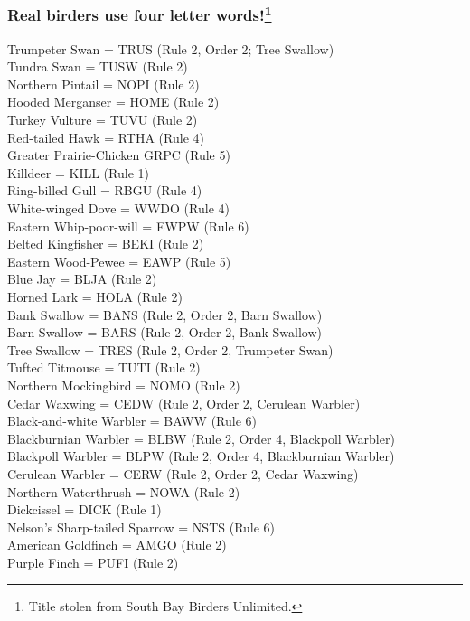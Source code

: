\documentclass[11pt]{article}
\begin{document}
\thispagestyle{plain}

\subsubsection*{Real birders use four letter words!\footnote{Title stolen from South Bay Birders Unlimited.}}

Trumpeter Swan = TRUS (Rule 2, Order 2; Tree Swallow)\\
Tundra Swan = TUSW (Rule 2)\\
Northern Pintail = NOPI (Rule 2)\\
Hooded Merganser = HOME (Rule 2)\\
Turkey Vulture = TUVU (Rule 2)\\
Red-tailed Hawk = RTHA (Rule 4)\\
Greater Prairie-Chicken GRPC (Rule 5)\\
Killdeer = KILL (Rule 1)\\
Ring-billed Gull = RBGU (Rule 4)\\
White-winged Dove = WWDO (Rule 4)\\
Eastern Whip-poor-will  = EWPW (Rule 6)\\
Belted Kingfisher = BEKI (Rule 2)\\
Eastern Wood-Pewee = EAWP (Rule 5)\\
Blue Jay = BLJA (Rule 2)\\
Horned Lark = HOLA (Rule 2)\\
Bank Swallow = BANS (Rule 2, Order 2, Barn Swallow)\\
Barn Swallow = BARS (Rule 2, Order 2, Bank Swallow)\\
Tree Swallow = TRES (Rule 2, Order 2, Trumpeter Swan)\\
Tufted Titmouse = TUTI (Rule 2)\\
Northern Mockingbird = NOMO (Rule 2)\\
Cedar Waxwing = CEDW (Rule 2, Order 2, Cerulean Warbler)\\
Black-and-white Warbler = BAWW (Rule 6)\\
Blackburnian Warbler = BLBW (Rule 2, Order 4, Blackpoll Warbler)\\
Blackpoll Warbler = BLPW (Rule 2, Order 4, Blackburnian Warbler)\\
Cerulean Warbler = CERW (Rule 2, Order 2, Cedar Waxwing)\\
Northern Waterthrush = NOWA (Rule 2)\\
Dickcissel = DICK (Rule 1)\\
Nelson's Sharp-tailed Sparrow = NSTS (Rule 6)\\
American Goldfinch = AMGO (Rule 2)\\
Purple Finch = PUFI (Rule 2)
\end{document}
